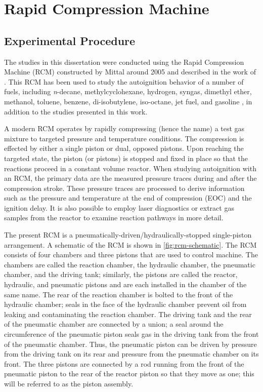\documentclass[12pt, letterpaper]{article}
\begin{document}
\section{Rapid Compression Machine}
\label{sec:rcm}
\subsection{Experimental Procedure}
The studies in this dissertation were conducted using the Rapid
Compression Machine (RCM) constructed by Mittal around 2005 and described in the
work of \textcite{Mittal2007,Mittal2006a}. This RCM has been used to
study the autoignition behavior of a number of fuels, including
\textit{n}-decane, methylcyclohexane, hydrogen, syngas,
dimethyl ether, methanol, toluene, benzene, di-isobutylene, iso-octane,
jet fuel, and gasoline \cite{Kumar2009, Mittal2009, Das2012a, Mittal2006,
Das2012, Mittal2008a, Kumar2011a, Mittal2007a, Mittal2008, Kumar2010,
Dooley2010, Dooley2012, Hui2012a, Keromnes2013, Kukkadapu2013, Kukkadapu2012a},
in addition to the studies presented in this work.

A modern RCM operates by rapidly compressing (hence the name) a test gas
mixture to targeted pressure and temperature conditions. The compression
is effected by either a single piston or dual, opposed pistons. Upon
reaching the targeted state, the piston (or pistons) is stopped and
fixed in place so that the reactions proceed in a constant volume
reactor. When studying autoignition with an RCM, the primary data are
the measured pressure traces during and after the compression stroke.
These pressure traces are processed to derive information such as the
pressure and temperature at the end of compression (EOC) and the
ignition delay. It is also possible to employ laser diagnostics or
extract gas samples from the reactor to examine reaction pathways in
more detail.

The present RCM is a pneumatically-driven/hydraulically-stopped
single-piston arrangement. A schematic of the RCM is shown in
\autoref{fig:rcm-schematic}. The RCM consists of four chambers and
three pistons that are used to control machine. The chambers are
called the reaction chamber, the hydraulic chamber, the pneumatic
chamber, and the driving tank; similarly, the pistons are called
the reactor, hydraulic, and pneumatic pistons and are each installed
in the chamber of the same name. The rear of the reaction chamber
is bolted to the front of the hydraulic chamber; seals in the face
of the hydraulic chamber prevent oil from leaking and contaminating
the reaction chamber. The driving tank and the rear of the pneumatic
chamber are connected by a union; a seal around the circumference of
the pneumatic piston seals gas in the driving tank from the front of
the pneumatic chamber. Thus, the pneumatic piston can be driven by
pressure from the driving tank on its rear and pressure from the
pneumatic chamber on its front. The three pistons are connected by
a rod running from the front of the pneumatic piston to the rear of
the reactor piston so that they move as one; this will be referred
to as the piston assembly.
\end{document}
